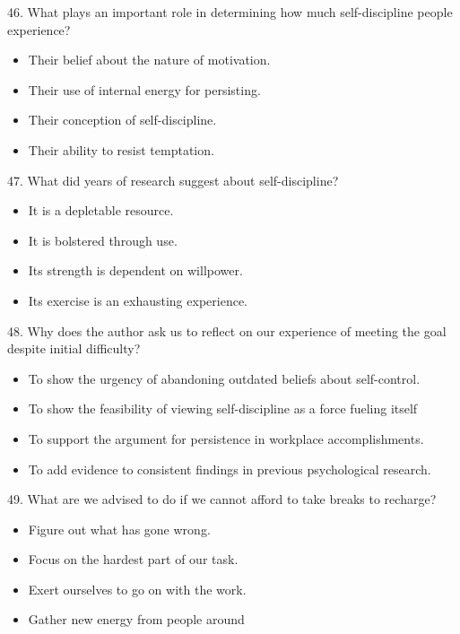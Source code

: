 \documentclass[UTF8,11pt]{ctexart}
\begin{document}
46. What plays an important role in determining how much self-discipline people experience?


\begin{itemize}[leftmargin=2em,itemsep=.2em,topsep=.4em]\item[A.] Their belief about the nature of motivation.
\item[B.] Their use of internal energy for persisting.
\item[C.] Their conception of self-discipline.
\item[D.] Their ability to resist temptation.
\end{itemize}

47. What did years of research suggest about self-discipline?


\begin{itemize}[leftmargin=2em,itemsep=.2em,topsep=.4em]\item[A.] It is a depletable resource.
\item[B.] It is bolstered through use.
\item[C.] Its strength is dependent on willpower.
\item[D.] Its exercise is an exhausting experience.
\end{itemize}

48. Why does the author ask us to reflect on our experience of meeting the goal despite initial difficulty?


\begin{itemize}[leftmargin=2em,itemsep=.2em,topsep=.4em]\item[A.] To show the urgency of abandoning outdated beliefs about self-control.
\item[B.] To show the feasibility of viewing self-discipline as a force fueling itself
\item[C.] To support the argument for persistence in workplace accomplishments.
\item[D.] To add evidence to consistent findings in previous psychological research.
\end{itemize}

49. What are we advised to do if we cannot afford to take breaks to recharge?


\begin{itemize}[leftmargin=2em,itemsep=.2em,topsep=.4em]\item[A.] Figure out what has gone wrong.
\item[B.] Focus on the hardest part of our task.
\item[C.] Exert ourselves to go on with the work.
\item[D.] Gather new energy from people around
\end{itemize}
\end{document}
